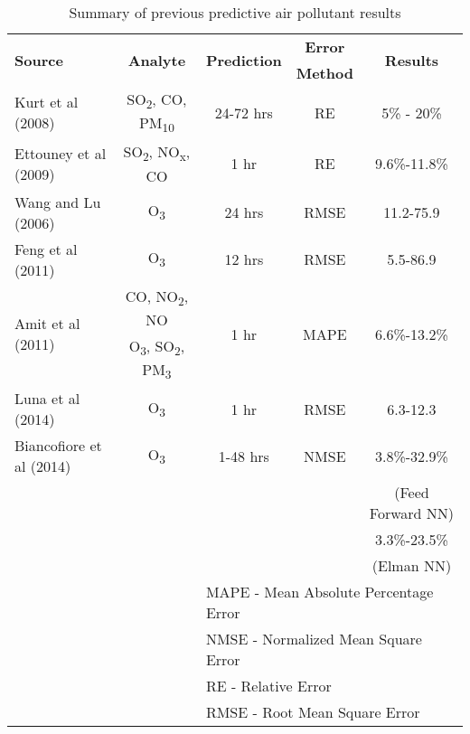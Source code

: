 \begin{table}[H]
\centering
\caption{Summary of previous predictive air pollutant results}
\label{tb:priorANNresults}
\begin{tabular}{@{}lcccc@{}}
\toprule
\multirow{2}{*}{\textbf{Source}} & \multirow{2}{*}{\textbf{Analyte}} & \multirow{2}{*}{\textbf{Prediction}} & \textbf{Error} & \multirow{2}{*}{\textbf{Results}} \\
 &  &  & \multicolumn{1}{l}{\textbf{Method}} &  \\ \hline
Kurt et al (2008) & SO\textsubscript{2}, CO, PM\textsubscript{10} & 24-72 hrs & RE & 5\% - 20\% \\
Ettouney et al (2009) & SO\textsubscript{2}, NO\textsubscript{x}, CO & 1 hr & RE & 9.6\%-11.8\% \\
Wang and Lu (2006) & O\textsubscript{3} & 24 hrs & RMSE & 11.2-75.9 \\
Feng et al (2011) & O\textsubscript{3} & 12 hrs & RMSE & 5.5-86.9 \\
\multirow{2}{*}{Amit et al (2011)} & CO, NO\textsubscript{2}, NO & \multirow{2}{*}{1 hr} & \multirow{2}{*}{MAPE} & \multirow{2}{*}{6.6\%-13.2\%} \\
 & O\textsubscript{3}, SO\textsubscript{2}, PM\textsubscript{3} &  &  &  \\
Luna et al (2014) & O\textsubscript{3} & 1 hr & RMSE & 6.3-12.3 \\
Biancofiore et al (2014) & O\textsubscript{3} & 1-48 hrs & NMSE & 3.8\%-32.9\% \\
 &  &  &  & (Feed Forward NN) \\
 &  &  &  & 3.3\%-23.5\% \\
 &  &  &  & (Elman NN)\\ \bottomrule
 &  & \multicolumn{3}{l}{MAPE - Mean Absolute Percentage Error} \\
 &  & \multicolumn{3}{l}{NMSE - Normalized Mean Square Error} \\
 &  & \multicolumn{3}{l}{RE - Relative Error}   \\
 &  & \multicolumn{3}{l}{RMSE - Root Mean Square Error}
\end{tabular}
\end{table}